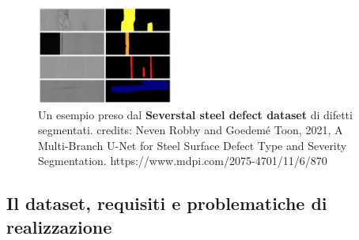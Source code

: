 \begin{figure}[H]
    \centering
    \includegraphics[width=0.4\textwidth]{imgs/segm_example_1_crop.png}
    \caption{Un esempio preso dal \textbf{Severstal steel defect dataset} di difetti segmentati.
    credits: Neven Robby and Goedemé Toon, 2021, A Multi-Branch U-Net for Steel Surface Defect Type and Severity Segmentation.
    https://www.mdpi.com/2075-4701/11/6/870}
    \label{fig:segm_example_1}
\end{figure}


\subsection{Il dataset, requisiti e problematiche di realizzazione \ok}

